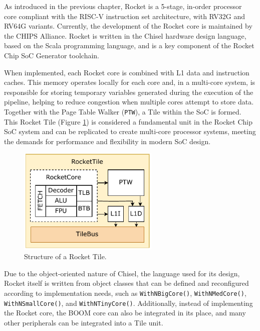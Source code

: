 As introduced in the previous chapter, Rocket is a 5-stage, in-order processor core compliant with the RISC-V instruction set architecture, with RV32G and RV64G variants. Currently, the development of the Rocket core is maintained by the CHIPS Alliance. Rocket is written in the Chisel hardware design language, based on the Scala programming language, and is a key component of the Rocket Chip SoC Generator toolchain.

When implemented, each Rocket core is combined with L1 data and instruction caches. This memory operates locally for each core and, in a multi-core system, is responsible for storing temporary variables generated during the execution of the pipeline, helping to reduce congestion when multiple cores attempt to store data. Together with the Page Table Walker (\texttt{PTW}), a Tile within the SoC is formed. This Rocket Tile (Figure \ref{fig:rocket_tile_structure}) is considered a fundamental unit in the Rocket Chip SoC system and can be replicated to create multi-core processor systems, meeting the demands for performance and flexibility in modern SoC design.

\begin{figure}[h!]
    \centering
    \includegraphics[width=0.6\textwidth]{Images/RocketTile_Basic.pdf}
    \caption{Structure of a Rocket Tile.}
    \label{fig:rocket_tile_structure}
\end{figure}

Due to the object-oriented nature of Chisel, the language used for its design, Rocket itself is written from object classes that can be defined and reconfigured according to implementation needs, such as \texttt{WithNBigCore()}, \texttt{WithNMedCore()}, \texttt{WithNSmallCore()}, and \texttt{WithNTinyCore()}. Additionally, instead of implementing the Rocket core, the BOOM core can also be integrated in its place, and many other peripherals can be integrated into a Tile unit.


